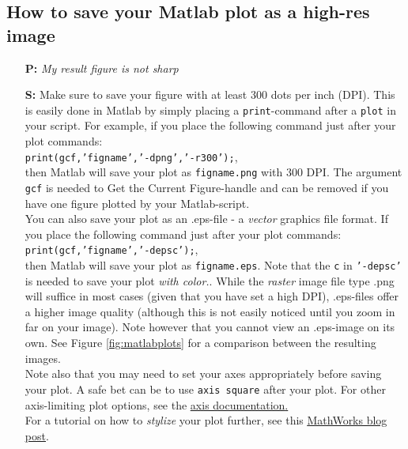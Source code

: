 \documentclass[fleqn,10pt]{SelfArx} %
\begin{document}
\subsection*{How to save your Matlab plot as a high-res image}
\begin{enumerate}[nolistsep]
    \item[\textbf{P:}] \textit{My result figure is not sharp}
    \item[\textbf{S:}] Make sure to save your figure with at least 300 dots per inch (DPI). This is easily done in Matlab by simply placing a \texttt{print}-command after a \texttt{plot} in your script. For example, if you place the following command just after your plot commands:\\

    \texttt{print(gcf,'figname','-dpng','-r300');}, \\
    
    then Matlab will save your plot as \texttt{figname.png} with 300 DPI. The argument \texttt{gcf} is needed to Get the Current Figure-handle and can be removed if you have one figure plotted by your Matlab-script. \\

    You can also save your plot as an .eps-file - a \textit{vector} graphics file format. If you place the following command just after your plot commands:\\
    
    \texttt{print(gcf,'figname','-depsc');},\\ 
    
    then Matlab will save your plot as \texttt{figname.eps}. Note that the \texttt{c} in \texttt{'-depsc'} is needed to save your plot \textit{with color.}. While the \textit{raster} image file type .png will suffice in most cases (given that you have set a high DPI), .eps-files offer a  higher image quality (although this is not easily noticed until you zoom in far on your image). Note however that you cannot view an .eps-image on its own. See Figure \ref{fig:matlabplots} for a comparison between the resulting images. \\
    
    Note also that you may need to set your axes appropriately before saving your plot. A safe bet can be to use \texttt{axis square} after your plot. For other axis-limiting plot options, see the \href{https://se.mathworks.com/help/matlab/ref/axis.html}{\underline{axis documentation}.}\\
    
    
    For a tutorial on how to \textit{stylize} your plot further, see this \href{https://blogs.mathworks.com/loren/2007/12/11/making-pretty-graphs/}{\underline{MathWorks blog post}}.
    
   
\end{enumerate}
\end{document}
